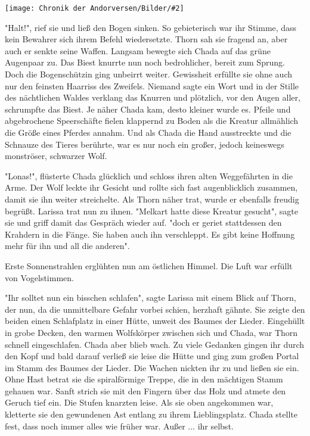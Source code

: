 \documentclass[10pt, a4paper, oneside]{book}
\newcommand{\bildmitts}[2][height=0.32\textwidth,width=0.48\textwidth,keepaspectratio]{%
    \begin{center}
        \texttt{[image: Chronik der Andorversen/Bilder/\#2]}
    \end{center}
}
\begin{document}
\begin{multicols}{2}
\bildmitts{Chada Lonas.jpg}

"Halt!", rief sie und ließ den Bogen sinken. So gebieterisch war ihr Stimme, dass kein Bewahrer sich ihrem Befehl wiedersetzte. Thorn sah sie fragend an, aber auch er senkte seine Waffen. Langsam bewegte sich Chada auf das grüne Augenpaar zu. Das Biest knurrte nun noch bedrohlicher, bereit zum Sprung. Doch die Bogenschützin ging unbeirrt weiter. Gewissheit erfüllte sie ohne auch nur den feinsten Haarriss des Zweifels. Niemand sagte ein Wort und in der Stille des nächtlichen Waldes verklang das Knurren und plötzlich, vor den Augen aller, schrumpfte das Biest. Je näher Chada kam, desto kleiner wurde es. Pfeile und abgebrochene Speerschäfte fielen klappernd zu Boden als die Kreatur allmählich die Größe eines Pferdes annahm. Und als Chada die Hand ausstreckte und die Schnauze des Tieres berührte, war es nur noch ein großer, jedoch keineswegs monströser, schwarzer Wolf.

"Lonas!", flüsterte Chada glücklich und schloss ihren alten Weggefährten in die Arme. Der Wolf leckte ihr Gesicht und rollte sich fast augenblicklich zusammen, damit sie ihn weiter streichelte. Als Thorn näher trat, wurde er ebenfalls freudig begrüßt. Larissa trat nun zu ihnen. "Melkart hatte diese Kreatur gesucht", sagte sie und griff damit das Gespräch wieder auf. "doch er geriet stattdessen den Krahdern in die Fänge. Sie haben auch ihn verschleppt. Es gibt keine Hoffnung mehr für ihn und all die anderen".

Erste Sonnenstrahlen erglühten nun am östlichen Himmel. Die Luft war erfüllt von Vogelstimmen.

"Ihr solltet nun ein bisschen schlafen", sagte Larissa mit einem Blick auf Thorn, der nun, da die unmittelbare Gefahr vorbei schien, herzhaft gähnte. Sie zeigte den beiden einen Schlafplatz in einer Hütte, unweit des Baumes der Lieder. Eingehüllt in grobe Decken, den warmen Wolfskörper zwischen sich und Chada, war Thorn schnell eingeschlafen. Chada aber blieb wach. Zu viele Gedanken gingen ihr durch den Kopf und bald darauf verließ sie leise die Hütte und ging zum großen Portal im Stamm des Baumes der Lieder. Die Wachen nickten ihr zu und ließen sie ein. Ohne Hast betrat sie die spiralförmige Treppe, die in den mächtigen Stamm gehauen war. Sanft strich sie mit den Fingern über das Holz und atmete den Geruch tief ein. Die Stufen knarzten leise. Als sie oben angekommen war, kletterte sie den gewundenen Ast entlang zu ihrem Lieblingsplatz. Chada stellte fest, dass noch immer alles wie früher war. Außer ... ihr selbst.


\end{multicols}
\end{document}
